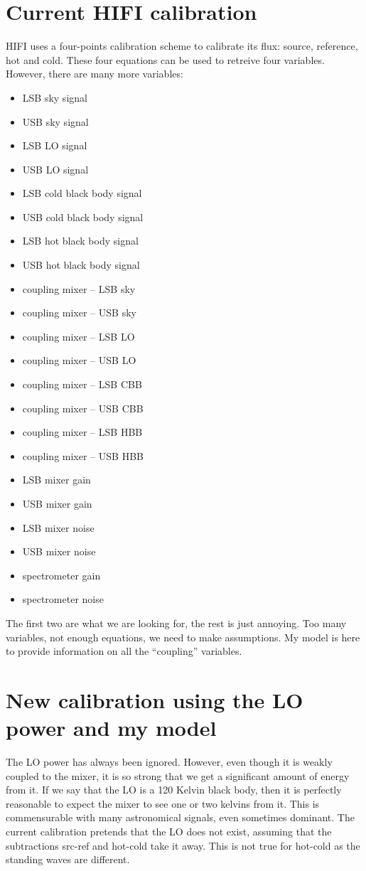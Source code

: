 \section{Current HIFI calibration}

HIFI uses a four-points calibration scheme to calibrate its flux: source, reference, hot and cold.
These four equations can be used to retreive four variables.
However, there are many more variables:
\begin{itemize}
    \item LSB sky signal
    \item USB sky signal
    \item LSB LO signal
    \item USB LO signal
    \item LSB cold black body signal
    \item USB cold black body signal
    \item LSB hot black body signal
    \item USB hot black body signal
    \item coupling mixer -- LSB sky
    \item coupling mixer -- USB sky
    \item coupling mixer -- LSB LO
    \item coupling mixer -- USB LO
    \item coupling mixer -- LSB CBB
    \item coupling mixer -- USB CBB
    \item coupling mixer -- LSB HBB
    \item coupling mixer -- USB HBB
    \item LSB mixer gain
    \item USB mixer gain
    \item LSB mixer noise
    \item USB mixer noise
    \item spectrometer gain
    \item spectrometer noise
\end{itemize}
The first two are what we are looking for, the rest is just annoying.
Too many variables, not enough equations, we need to make assumptions.
My model is here to provide information on all the ``coupling'' variables.

\section{New calibration using the LO power and my model}
The LO power has always been ignored.
However, even though it is weakly coupled to the mixer, it is so strong that we get a significant amount of energy from it.
If we say that the LO is a 120 Kelvin black body, then it is perfectly reasonable to expect the mixer to see one or two kelvins from it.
This is commensurable with many astronomical signals, even sometimes dominant.
The current calibration pretends that the LO does not exist, assuming that the subtractions src-ref and hot-cold take it away.  This is not true for hot-cold as the standing waves are different.

